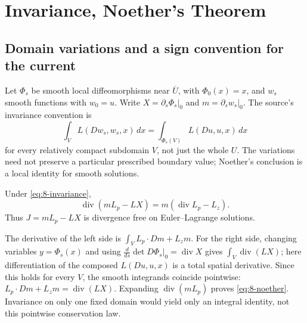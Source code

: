 \Needspace{55mm}
\section{Invariance, Noether's Theorem}
\label{sec:8-6}
\Needspace{45mm}
\subsection{Domain variations and a sign convention for the current}
Let $\Phi_s$ be smooth local diffeomorphisms near $\overline U$, with
$\Phi_0(x)=x$, and $w_s$ smooth functions with $w_0=u$.
Write $X=\partial_s\Phi_s|_0$ and $m=\partial_sw_s|_0$.
The source's invariance convention is
\begin{equation}\label{eq:8-invariance}
 \int_VL(Dw_s,w_s,x)\,dx
 =\int_{\Phi_s(V)}L(Du,u,x)\,dx
\end{equation}
for every relatively compact subdomain $V$, not just the whole $U$.
The variations need not preserve a particular prescribed boundary value;
Noether's conclusion is a local identity for smooth solutions.
\Needspace{55mm}
\begin{theorem}
Under \eqref{eq:8-invariance},
\begin{equation}\label{eq:8-noether}
 \operatorname{div}(mL_p-LX)
 =m(\operatorname{div}L_p-L_z).
\end{equation}
Thus $J=mL_p-LX$ is divergence free on Euler--Lagrange solutions.
\end{theorem}
\begin{expandedproof}
The derivative of the left side is $\int_V L_p\cdot Dm+L_zm$.
For the right side, changing variables $y=\Phi_s(x)$ and using
$\frac d{ds}\det D\Phi_s|_0=\operatorname{div}X$ gives
$\int_V\operatorname{div}(LX)$; here differentiation of the composed
$L(Du,u,x)$ is a total spatial derivative.
Since this holds for every $V$, the smooth integrands coincide pointwise:
$L_p\cdot Dm+L_zm=\operatorname{div}(LX)$.
Expanding $\operatorname{div}(mL_p)$ proves \eqref{eq:8-noether}.
Invariance on only one fixed domain would yield only an integral identity,
not this pointwise conservation law.
\end{expandedproof}
\Needspace{55mm}

